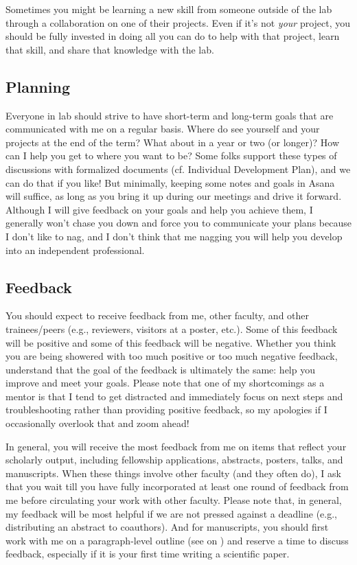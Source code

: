 \documentclass[letterpaper,11pt,oneside]{memoir}
\begin{document}
Sometimes you might be learning a new skill from someone outside of the lab through a collaboration on one of their projects. Even if it's not \textit{your} project, you should be fully invested in doing all you can do to help with that project, learn that skill, and share that knowledge with the lab. 

\subsection{Planning}
Everyone in lab should strive to have short-term and long-term goals that are communicated with me on a regular basis. Where do see yourself and your projects at the end of the term? What about in a year or two (or longer)? How can I help you get to where you want to be? Some folks support these types of discussions with formalized documents (cf. Individual Development Plan), and we can do that if you like! But minimally, keeping some notes and goals in Asana will suffice, as long as you bring it up during our meetings and drive it forward. Although I will give feedback on your goals and help you achieve them, I generally won't chase you down and force you to communicate your plans because I don't like to nag, and I don't think that me nagging you will help you develop into an independent professional. 

\subsection{Feedback}
You should expect to receive feedback from me, other faculty, and other trainees/peers (e.g., reviewers, visitors at a poster, etc.). Some of this feedback will be positive and some of this feedback will be negative. Whether you think you are being showered with too much positive or too much negative feedback, understand that the goal of the feedback is ultimately the same: help you improve and meet your goals. Please note that one of my shortcomings as a mentor is that I tend to get distracted and immediately focus on next steps and troubleshooting rather than providing positive feedback, so my apologies if I occasionally overlook that and zoom ahead!

In general, you will receive the most feedback from me on items that reflect your scholarly output, including fellowship applications, abstracts, posters, talks, and manuscripts. When these things involve other faculty (and they often do), I ask that you wait till you have fully incorporated at least one round of feedback from me before circulating your work with other faculty. Please note that, in general, my feedback will be most helpful if we are not pressed against a deadline (e.g., distributing an abstract to coauthors). And for manuscripts, you should first work with me on a paragraph-level outline (see  on ) and reserve a time to discuss feedback, especially if it is your first time writing a scientific paper.
\end{document}
